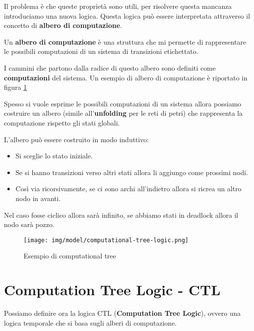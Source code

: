Il problema è che queste proprietà sono utili, per risolvere questa mancanza
introduciamo una nuova logica. Questa logica può essere interpretata attraverso
il concetto di \textbf{albero di computazione}.
\begin{definizione}
    Un \textbf{albero di computazione} è una struttura che mi permette di
    rappresentare le possibili computazioni di un sistema di transizioni
    etichettato.

    I cammini che partono dalla radice di questo albero sono definiti come
    \textbf{computazioni} del sistema. Un esempio di albero di computazione è
    riportato in figura \ref{fig:computational-tree-logic}
\end{definizione}
\begin{nota}
    Spesso si vuole esprime le possibili computazioni di un sistema allora
    possiamo costruire un albero (simile all'\textbf{unfolding} per le reti di
    petri) che rappresenta la computazione rispetto gli stati globali.

    L'albero può essere costruito in modo induttivo:
    \begin{itemize}
        \item Si sceglie lo stato iniziale.
        \item Se si hanno transizioni verso altri stati allora li aggiungo come
              prossimi nodi.
        \item Così via ricorsivamente, se ci sono archi all'indietro allora
              si ricrea un altro nodo in avanti.
    \end{itemize}
    Nel caso fosse ciclico allora sarà infinito, se abbiamo stati in deadlock
    allora il nodo sarà pozzo.
\end{nota}
\begin{figure}
    \centering
    \texttt{[image: img/model/computational-tree-logic.png]}
    \caption{Esempio di computational tree}
    \label{fig:computational-tree-logic}
\end{figure}
\section{Computation Tree Logic - CTL}
Possiamo definire ora la logica CTL (\textbf{Computation Tree Logic}), ovvero
una logica temporale che si basa sugli alberi di computazione.

